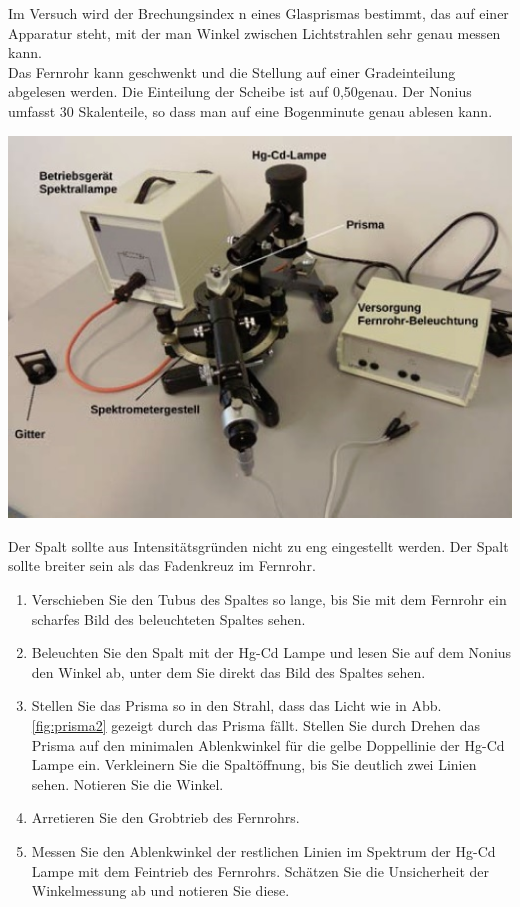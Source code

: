 \begin{minipage}{.4\textwidth}
Im Versuch wird der Brechungsindex n eines Glasprismas bestimmt, das auf einer Apparatur steht, mit der man Winkel zwischen Lichtstrahlen sehr genau messen kann.\\

\noindent
Das Fernrohr kann geschwenkt und die Stellung auf einer Gradeinteilung abgelesen werden. Die Einteilung der Scheibe ist auf 0,50\degree genau. Der Nonius umfasst 30 Skalenteile, so dass man auf eine Bogenminute genau ablesen kann.

\end{minipage}
%
\begin{minipage}{.6\textwidth}	
	\begin{center}
		\includegraphics[width=.9\textwidth]{Abbildungen/Prismenaufbau.jpg}
	\end{center}
\end{minipage}

Der Spalt sollte aus Intensitätsgründen nicht zu eng eingestellt werden. Der Spalt sollte breiter sein als das Fadenkreuz im Fernrohr.

\begin{enumerate}
	\item Verschieben Sie den Tubus des Spaltes so lange, bis Sie mit dem Fernrohr ein scharfes Bild des beleuchteten Spaltes sehen.
	\item Beleuchten Sie den Spalt mit der Hg-Cd Lampe und lesen Sie auf dem Nonius den Winkel ab, unter dem Sie direkt das Bild des Spaltes sehen. \label{task:Spaltbild}
	\item Stellen Sie das Prisma so in den Strahl, dass das Licht wie in Abb. \ref{fig:prisma2} gezeigt durch das Prisma fällt. Stellen Sie durch Drehen das Prisma auf den minimalen Ablenkwinkel für die gelbe Doppellinie der Hg-Cd Lampe ein. Verkleinern Sie die Spaltöffnung, bis Sie deutlich zwei Linien sehen. Notieren Sie die Winkel.
	\item Arretieren Sie den Grobtrieb des Fernrohrs. 
	\item Messen Sie den Ablenkwinkel der restlichen Linien im Spektrum der Hg-Cd Lampe mit dem Feintrieb des Fernrohrs. Schätzen Sie die Unsicherheit der Winkelmessung ab und notieren Sie diese. \label{task:HgSpektrum}
\end{enumerate}

